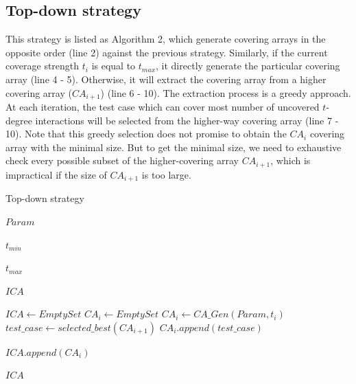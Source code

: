 \documentclass[conference]{IEEEtran}
\theoremstyle{definition}
\begin{document}
\subsection{Top-down strategy}
This strategy is listed as Algorithm 2, which generate covering arrays in the opposite order (line 2) against the previous strategy. Similarly, if the current coverage strength $t_{i}$ is equal to $t_{max}$, it directly generate the particular covering array (line 4 - 5). Otherwise, it will extract the covering array from a higher covering array ($CA_{i + 1}$) (line 6 - 10). The extraction process is a greedy approach. At each iteration, the test case which can cover most number of uncovered $t$-degree interactions will be selected from the higher-way covering array (line 7 - 10).  Note that this greedy selection does not promise to obtain the $CA_{i}$ covering array with the minimal size. But to get the minimal size, we need to exhaustive check every possible subset of the higher-covering array $CA_{i+1}$, which is impractical if the size of $CA_{i + 1}$ is too large.

%
\begin{algorithm}
  \caption{Top-down strategy}
  \begin{algorithmic}[1]
    \Require
     $Param$ 

     $t_{min}$ 

     $t_{max}$ 

     \Ensure  $ICA$ 

      \State $ICA \leftarrow Empty Set$
         \State $CA_{i} \leftarrow  Empty Set $
                \State $CA_{i} \leftarrow CA\_Gen(Param, t_{i})$
         \Else
                \State $test\_case \leftarrow selected\_best(CA_{i + 1})$
                \State $CA_{i}.append(test\_case)$
             \EndWhile
        \EndIf

        \State $ICA.append(CA_{i})$
      \EndFor

     \State \Return $ICA$
  \end{algorithmic}
\end{algorithm}
\end{document}
